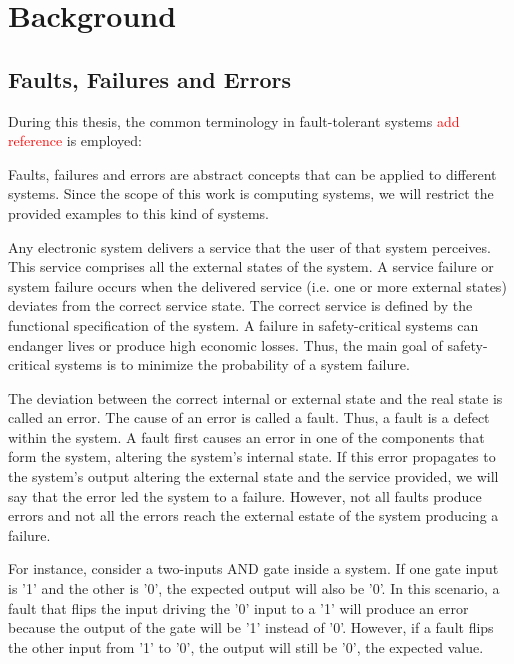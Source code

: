 
\chapter{Background} %

\label{Chapter2} %





\section{Faults, Failures and Errors}

During this thesis, the common terminology in fault-tolerant systems \textcolor{red}{add reference} is employed:

Faults, failures and errors are abstract concepts that can be applied to different systems. Since the scope of this work is computing systems, we will restrict the provided examples to this kind of systems.

Any electronic system delivers a service that the user of that system perceives. This service comprises all the external states of the system. A service failure or system failure occurs when the delivered service (i.e. one or more external states) deviates from the correct service state. The correct service is defined by the functional specification of the system. A failure in safety-critical systems can endanger lives or produce high economic losses. Thus, the main goal of safety-critical systems is to minimize the probability of a system failure.

The deviation between the correct internal or external state and the real state is called an error. The cause of an error is called a fault. Thus, a fault is a defect within the system. A fault first causes an error in one of the components that form the system, altering the system's internal state. If this error propagates to the system's output altering the external state and the service provided, we will say that the error led the system to a failure. However, not all faults produce errors and not all the errors reach the external estate of the system producing a failure.  

For instance, consider a two-inputs AND gate inside a system. If one gate input is '1' and the other is '0', the expected output will also be '0'. In this scenario, a fault that flips the input driving the '0' input to a '1' will produce an error because the output of the gate will be '1' instead of '0'. However, if a fault flips the other input from '1' to '0', the output will still be '0', the expected value. 

